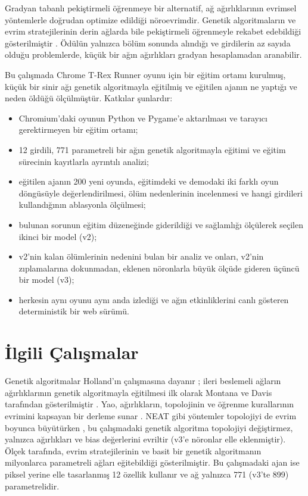 \documentclass[11pt,a4paper]{article}
\begin{document}
Gradyan tabanlı pekiştirmeli öğrenmeye bir alternatif, ağ ağırlıklarının evrimsel yöntemlerle doğrudan optimize edildiği nöroevrimdir. Genetik algoritmaların ve evrim stratejilerinin derin ağlarda bile pekiştirmeli öğrenmeyle rekabet edebildiği gösterilmiştir \cite{such2017,salimans2017}. Ödülün yalnızca bölüm sonunda alındığı ve girdilerin az sayıda olduğu problemlerde, küçük bir ağın ağırlıkları gradyan hesaplamadan aranabilir.

Bu çalışmada Chrome T-Rex Runner oyunu için bir eğitim ortamı kurulmuş, küçük bir sinir ağı genetik algoritmayla eğitilmiş ve eğitilen ajanın ne yaptığı ve neden öldüğü ölçülmüştür. Katkılar şunlardır:
\begin{itemize}
  \item Chromium'daki oyunun Python ve Pygame'e aktarılması ve tarayıcı gerektirmeyen bir eğitim ortamı;
  \item 12 girdili, 771 parametreli bir ağın genetik algoritmayla eğitimi ve eğitim sürecinin kayıtlarla ayrıntılı analizi;
  \item eğitilen ajanın 200 yeni oyunda, eğitimdeki ve demodaki iki farklı oyun döngüsüyle değerlendirilmesi, ölüm nedenlerinin incelenmesi ve hangi girdileri kullandığının ablasyonla ölçülmesi;
  \item bulunan sorunun eğitim düzeneğinde giderildiği ve sağlamlığı ölçülerek seçilen ikinci bir model (v2);
  \item v2'nin kalan ölümlerinin nedenini bulan bir analiz ve onları, v2'nin zıplamalarına dokunmadan, eklenen nöronlarla büyük ölçüde gideren üçüncü bir model (v3);
  \item herkesin aynı oyunu aynı anda izlediği ve ağın etkinliklerini canlı gösteren deterministik bir web sürümü.
\end{itemize}

\section{İlgili Çalışmalar}

Genetik algoritmalar Holland'ın çalışmasına dayanır \cite{holland1975}; ileri beslemeli ağların ağırlıklarının genetik algoritmayla eğitilmesi ilk olarak Montana ve Davis tarafından gösterilmiştir \cite{montana1989}. Yao, ağırlıkların, topolojinin ve öğrenme kurallarının evrimini kapsayan bir derleme sunar \cite{yao1999}. NEAT gibi yöntemler topolojiyi de evrim boyunca büyütürken \cite{stanley2002}, bu çalışmadaki genetik algoritma topolojiyi değiştirmez, yalnızca ağırlıkları ve bias değerlerini evriltir (v3'e nöronlar elle eklenmiştir). Ölçek tarafında, evrim stratejilerinin \cite{salimans2017} ve basit bir genetik algoritmanın \cite{such2017} milyonlarca parametreli ağları eğitebildiği gösterilmiştir. Bu çalışmadaki ajan ise piksel yerine elle tasarlanmış 12 özellik kullanır ve ağ yalnızca 771 (v3'te 899) parametrelidir.
\end{document}

